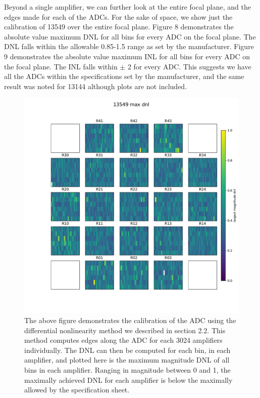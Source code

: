 \documentclass[11pt, letterpaper]{article}
\begin{document}
Beyond a single amplifier, we can further look at the entire focal plane, and the edges made for each of the ADCs. 
For the sake of space, we show just the calibration of 13549 over the entire focal plane. 
Figure 8 demonstrates the absolute value maximum DNL for all bins for every ADC on the focal plane. 
The DNL falls within the allowable 0.85-1.5 range as set by the manufacturer.  
Figure 9 demonstrates the absolute value maximum INL for all bins for every ADC on the focal plane. 
The INL falls within $\pm$ 2 for every ADC. 
This suggests we have all the ADCs within the specifications set by the manufacturer, and the same result was noted for 13144 although plots are not included. 

\begin{figure}
    \centering
    \includegraphics[width=0.5\linewidth]{maxdnlplot.pdf}
    \caption{The above figure demonstrates the calibration of the ADC using the differential nonlinearity method we described in section 2.2. This method computes edges along the ADC for each 3024 amplifiers individually. The DNL can then be computed for each bin, in each amplifier, and plotted here is the maximum magnitude DNL of all bins in each amplifier. Ranging in magnitude between 0 and 1, the maximally achieved DNL for each amplifier is below the maximally allowed by the specification sheet. }
    \label{fig:enter-label}
\end{figure}
\end{document}
